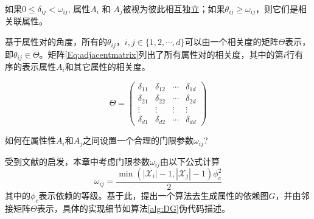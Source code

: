 \begin{corollary}
	如果$0 \leq \delta_{ij} < \omega_{ij}$, 属性$A_i$ 和 $A_j$被视为彼此相互独立；如果$\theta_{ij} \geq \omega_{ij}$，则它们是相关联属性。
\end{corollary}

基于属性对的角度，所有的$\theta_{ij}$，$i,j\in \{1,2,\cdots,d\}$可以由一个相关度的矩阵$\Theta$表示，即$\theta_{ij} \in \Theta$。矩阵\ref{Eq:adjacentmatrix}列出了所有属性对的相关度，其中的第$i$行有序的表示属性$A_i$和其它属性的相关度。

\begin{equation}\label{Eq:adjacentmatrix}
	\Theta=\begin{pmatrix}
		\delta_{11}& \delta_{12}&\cdots &\delta_{1d}\\
		\delta_{21}& \delta_{22}&\cdots &\delta_{2d}\\
		\vdots & \vdots &\vdots &\vdots\\
		\delta_{d1}& \delta_{d2}&\cdots & \delta_{dd}
	\end{pmatrix}
\end{equation}

\begin{question}
如何在属性性$A_i$和$A_j$之间设置一个合理的门限参数$\omega_{ij}$?
\end{question}
受到文献的启发，本章中考虑门限参数$\omega_{ij}$由以下公式计算
\begin{equation}\label{Eq:threshold}
	\omega_{ij} = \frac{\min(|\mathcal{X}_i|-1, |\mathcal{X}_j|-1)\phi_{c}^{2}}{2}
\end{equation}
其中的$\phi_{c}$表示依赖的等级。基于此，提出一个算法去生成属性的依赖图$G$，并由邻接矩阵$\Theta$表示，具体的实现细节如算法\ref{alg:DG}伪代码描述。

